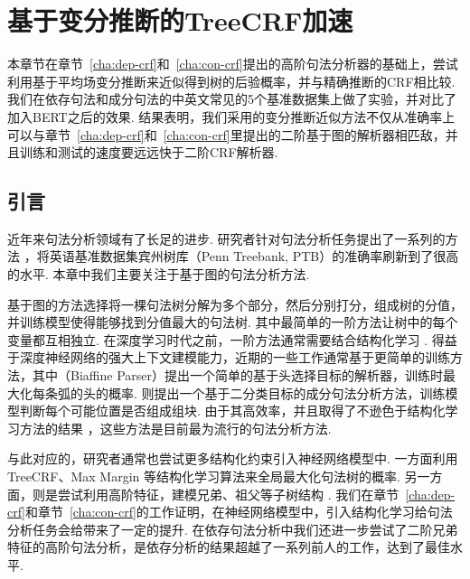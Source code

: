 \chapter{基于变分推断的TreeCRF加速}
\label{cha:vi}

本章节在章节~\ref{cha:dep-crf}和~\ref{cha:con-crf}提出的高阶句法分析器的基础上，尝试利用基于平均场变分推断来近似得到树的后验概率，并与精确推断的CRF相比较.
我们在依存句法和成分句法的中英文常见的5个基准数据集上做了实验，并对比了加入BERT之后的效果.
结果表明，我们采用的变分推断近似方法不仅从准确率上可以与章节~\ref{cha:dep-crf}和~\ref{cha:con-crf}里提出的二阶基于图的解析器相匹敌，并且训练和测试的速度要远远快于二阶CRF解析器.

\section{引言}\label{sec:vi-intro}
近年来句法分析领域有了长足的进步.
研究者针对句法分析任务提出了一系列的方法 \citep{dozat-etal-2017-biaffine,gomez-rodriguez-vilares-2018-constituent,ji-etal-2019-graph,zhang-etal-2020-fast,wei-etal-2020-span}，将英语基准数据集宾州树库（Penn Treebank, PTB）的准确率刷新到了很高的水平.
本章中我们主要关注于基于图的句法分析方法.

基于图的方法选择将一棵句法树分解为多个部分，然后分别打分，组成树的分值，并训练模型使得能够找到分值最大的句法树.
其中最简单的一阶方法让树中的每个变量都互相独立.
在深度学习时代之前，一阶方法通常需要结合结构化学习 \citep{mcdonald-etal-2005-online,koo-etal-2007-structured,taskar-etal-2004-max}.
得益于深度神经网络的强大上下文建模能力，近期的一些工作通常基于更简单的训练方法，其中\citet{dozat-etal-2017-biaffine}（Biaffine Parser）提出一个简单的基于头选择目标的解析器，训练时最大化每条弧的头的概率.
\citet{gaddy-etal-2018-whats}则提出一个基于二分类目标的成分句法分析方法，训练模型判断每个可能位置是否组成组块.
由于其高效率，并且取得了不逊色于结构化学习方法的结果 \citep{zhang-etal-2019-empirical,falenska-kuhn-2019-non}，这些方法是目前最为流行的句法分析方法.

与此对应的，研究者通常也尝试更多结构化约束引入神经网络模型中.
一方面利用TreeCRF、Max Margin \citep{ma-hovy-2017-neural,falenska-kuhn-2019-non,stern-etal-2017-minimal}等结构化学习算法来全局最大化句法树的概率.
另一方面，则是尝试利用高阶特征，建模兄弟、祖父等子树结构 \citep{mcdonald-pereira-2006-online,koo-collins-2010-efficient}.
我们在章节~\ref{cha:dep-crf}和章节~\ref{cha:con-crf}的工作证明，在神经网络模型中，引入结构化学习给句法分析任务会给带来了一定的提升.
在依存句法分析中我们还进一步尝试了二阶兄弟特征的高阶句法分析，是依存分析的结果超越了一系列前人的工作，达到了最佳水平.

